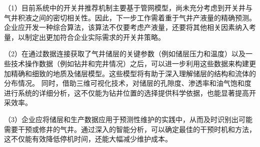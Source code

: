 （1）目前系统中的开关井推荐机制主要基于管网模型，尚未充分考虑到开关井与气井积液之间的密切相关性。因此，下一步工作需着重于气井产液量的精确预测。企业应开发一种综合算法，该算法不仅要考虑产液量，还要将其他相关因素纳入考量，以制定出更加符合企业实际需求的开关井策略。

（2）在通过数据连接获取了气井储层的关键参数（例如储层压力和温度）以及一些技术操作数据（例如钻井和完井情况）之后，可以进一步利用这些数据来构建更加精确和细致的地质及储层模型。这些模型将有助于深入理解储层的结构和流体的分布情况。
同时，借助三维可视化技术，对储层的孔隙度、渗透率和油气饱和度进行系统的详细分析，这不仅能为钻井位置的选择提供科学依据，也能显著提高开采效率。

（3）企业应将储层和生产数据应用于预测性维护的实践中，从而及时识别出可能需要干预或修井的气井。通过深入的智能分析，可以确定最佳的干预时机和方法，这不仅能有效降低停机时间，还能大幅减少维护成本。